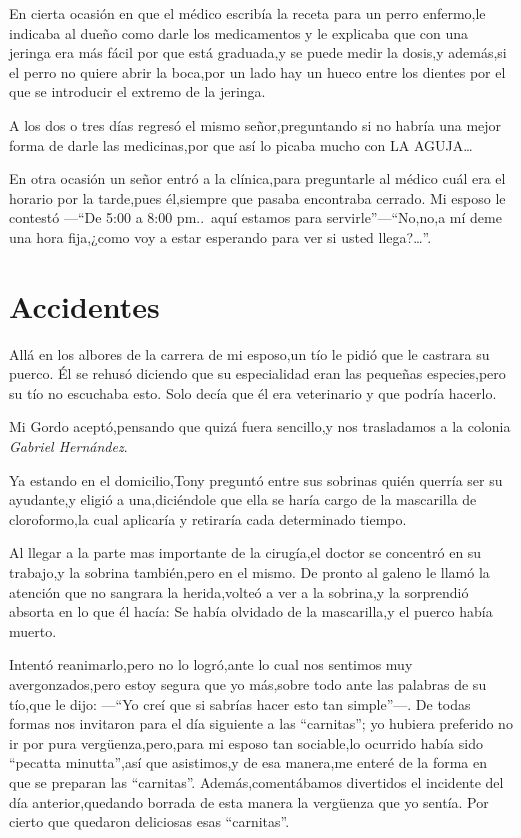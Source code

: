 \documentclass[letterpaper,12pt]{book}
\begin{document}
En cierta ocasión en que el médico escribía la receta para un perro enfermo,le indicaba al dueño como darle los medicamentos y le explicaba que con una jeringa era más fácil por que está graduada,y se puede medir la dosis,y además,si el perro no quiere abrir la boca,por un lado hay un hueco entre los dientes por el que se introducir el extremo de la jeringa.

A los dos o tres días regresó el mismo señor,preguntando si no habría una mejor forma de darle las medicinas,por que así lo picaba mucho con LA AGUJA\ldots

En otra ocasión un señor entró a la clínica,para preguntarle al médico cuál era el horario por la tarde,pues él,siempre que pasaba encontraba cerrado. Mi esposo le contestó ---``De 5:00 a 8:00 pm..\ aquí estamos para servirle''---``No,no,a mí deme una hora fija,¿como voy a estar esperando para ver si usted llega?\ldots''.

\chapter{Accidentes}

Allá en los albores de la carrera de mi esposo,un tío le pidió que le castrara su puerco. Él se rehusó diciendo que su especialidad eran las pequeñas especies,pero su tío no escuchaba esto. Solo decía que él era veterinario y que podría hacerlo.

Mi Gordo aceptó,pensando que quizá fuera sencillo,y nos trasladamos a la colonia \textit{Gabriel Hernández}. 

Ya estando en el domicilio,Tony preguntó entre sus sobrinas quién querría ser su ayudante,y eligió a una,diciéndole que ella se haría cargo  de la mascarilla de cloroformo,la cual aplicaría y retiraría cada determinado tiempo.

Al llegar a la parte mas importante de la cirugía,el doctor se concentró en su trabajo,y la sobrina también,pero en el mismo. De pronto al galeno le llamó la atención que no sangrara la herida,volteó a ver a la sobrina,y la sorprendió absorta en lo que él hacía: Se había olvidado de la mascarilla,y el puerco había muerto.

Intentó reanimarlo,pero no lo logró,ante lo cual nos sentimos muy avergonzados,pero estoy segura que yo más,sobre todo ante las palabras de su tío,que le dijo: ---``Yo creí que si sabrías hacer esto tan simple''---. De todas formas nos invitaron para el día siguiente a las ``carnitas''; yo hubiera preferido no ir por pura vergüenza,pero,para mi esposo tan sociable,lo ocurrido había sido ``pecatta minutta'',así que asistimos,y de esa manera,me enteré de la forma en que se preparan las ``carnitas''. Además,comentábamos divertidos el incidente del día anterior,quedando borrada de esta manera la vergüenza que yo sentía. Por cierto que quedaron deliciosas esas ``carnitas''.
\end{document}
